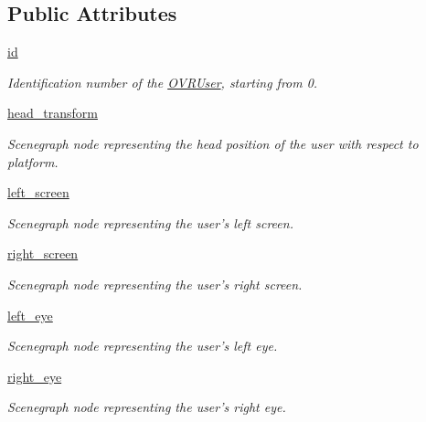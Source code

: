 \subsection*{\-Public \-Attributes}
\begin{DoxyCompactItemize}
\item 
\hyperlink{classlib_1_1OVRUser_1_1OVRUser_adafb47439a317521456c2e77c110c90f}{id}
\begin{DoxyCompactList}\small\item\em \-Identification number of the \hyperlink{classlib_1_1OVRUser_1_1OVRUser}{\-O\-V\-R\-User}, starting from 0. \end{DoxyCompactList}\item 
\hyperlink{classlib_1_1OVRUser_1_1OVRUser_a23cfa0813203eb4c15a5ad56eba7cbee}{head\-\_\-transform}
\begin{DoxyCompactList}\small\item\em \-Scenegraph node representing the head position of the user with respect to platform. \end{DoxyCompactList}\item 
\hyperlink{classlib_1_1OVRUser_1_1OVRUser_adc9db0f22c3da06bd920cf92900cdf05}{left\-\_\-screen}
\begin{DoxyCompactList}\small\item\em \-Scenegraph node representing the user's left screen. \end{DoxyCompactList}\item 
\hyperlink{classlib_1_1OVRUser_1_1OVRUser_ac7d2a03e753241e029d70a59731f26ce}{right\-\_\-screen}
\begin{DoxyCompactList}\small\item\em \-Scenegraph node representing the user's right screen. \end{DoxyCompactList}\item 
\hyperlink{classlib_1_1OVRUser_1_1OVRUser_a928654a589e8f83c7bb14e398e1c7262}{left\-\_\-eye}
\begin{DoxyCompactList}\small\item\em \-Scenegraph node representing the user's left eye. \end{DoxyCompactList}\item 
\hyperlink{classlib_1_1OVRUser_1_1OVRUser_a0d48b08791f4a871e76a9305e306ec76}{right\-\_\-eye}
\begin{DoxyCompactList}\small\item\em \-Scenegraph node representing the user's right eye. \end{DoxyCompactList}\item 

\end{DoxyCompactItemize}
